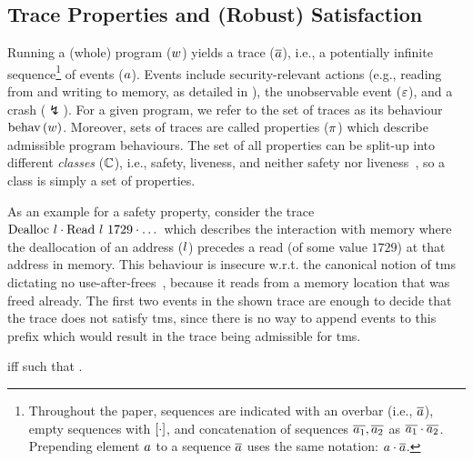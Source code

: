 \subsection{Trace Properties and (Robust) Satisfaction}\label{subsec:bg:tprop}

Running a (whole) program ($\wholeprogvar$) yields a trace ($\trace$), i.e., a potentially infinite sequence\footnote{
Throughout the paper, sequences are indicated with an overbar (i.e., $\trace$), empty sequences with $\hole{\cdot}$, and concatenation of sequences $\trace[_{1}],\trace[_{2}]$ as $\trace[_{1}]\cdot\trace[_{2}]$.
Prepending element $\event$ to a sequence $\trace$ uses the same notation: $\event\cdot\trace$.
} of events ($\event$).
Events include security-relevant actions (e.g., reading from and writing to memory, as detailed in ), the unobservable event ($\emptyevent$), and a crash ($\lightning$).
For a given program, we refer to the set of traces as its behaviour $\behav{\wholeprogvar}$. 
Moreover, sets of traces are called properties ($\varProp$) which describe admissible program behaviours. %
% 
The set of all properties can be split-up into different {\em classes} ($\class$), i.e., safety, liveness, and neither safety nor liveness~\cite{clarkson2008hyper}, so a class is simply a set of properties.
% 

As an example for a safety property, consider the trace $\ev{Dealloc\ \loc}\cdot\ev{Read\ \loc\ 1729}\cdot\dots$ which describes the interaction with memory where the deallocation of an address ($\loc$) precedes a read (of some value $1729$) at that address in memory.
% 
This behaviour is insecure w.r.t. the canonical notion of \gls*{tms} dictating no use-after-frees~\cite{nagarakatte2010cets,azevedo2018meaningsofms}, because it reads from a memory location that was freed already.
The first two events in the shown trace are enough to decide that the trace does not satisfy \gls*{tms}, since there is no way to append events to this prefix which would result in the trace being admissible for \gls*{tms}.

 iff  such that .

